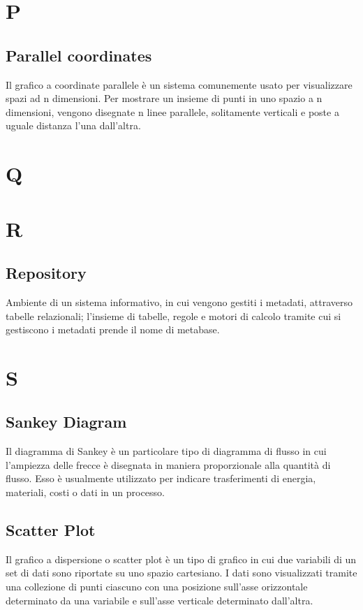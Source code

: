 \newpage
\section{P}
\subsection{Parallel coordinates}
Il grafico a coordinate parallele è un sistema comunemente usato per visualizzare spazi ad n dimensioni. Per mostrare un insieme di punti in uno spazio a n dimensioni, vengono disegnate n linee parallele, solitamente verticali e poste a uguale distanza l'una dall'altra.

\newpage
\section{Q}

\newpage
\section{R}
\subsection{Repository}
Ambiente di un sistema informativo, in cui vengono gestiti i metadati, attraverso tabelle relazionali;
l’insieme di tabelle, regole e motori di calcolo tramite cui si gestiscono i metadati prende il nome di
metabase.

\newpage
\section{S}
\subsection{Sankey Diagram}
Il diagramma di Sankey è un particolare tipo di diagramma di flusso in cui l'ampiezza delle frecce è disegnata in maniera proporzionale alla quantità di flusso.
Esso è usualmente utilizzato per indicare trasferimenti di energia, materiali, costi o dati in un processo.

\subsection{Scatter Plot}
Il grafico a dispersione o scatter plot è un tipo di grafico in cui due variabili di un set di dati sono riportate su uno spazio cartesiano.
I dati sono visualizzati tramite una collezione di punti ciascuno con una posizione sull'asse orizzontale determinato da una variabile e sull'asse verticale determinato dall'altra. 


